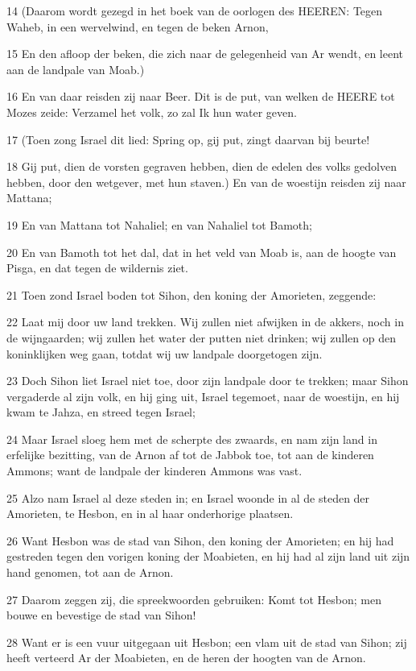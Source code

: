 \par 14 (Daarom wordt gezegd in het boek van de oorlogen des HEEREN: Tegen Waheb, in een wervelwind, en tegen de beken Arnon,
\par 15 En den afloop der beken, die zich naar de gelegenheid van Ar wendt, en leent aan de landpale van Moab.)
\par 16 En van daar reisden zij naar Beer. Dit is de put, van welken de HEERE tot Mozes zeide: Verzamel het volk, zo zal Ik hun water geven.
\par 17 (Toen zong Israel dit lied: Spring op, gij put, zingt daarvan bij beurte!
\par 18 Gij put, dien de vorsten gegraven hebben, dien de edelen des volks gedolven hebben, door den wetgever, met hun staven.) En van de woestijn reisden zij naar Mattana;
\par 19 En van Mattana tot Nahaliel; en van Nahaliel tot Bamoth;
\par 20 En van Bamoth tot het dal, dat in het veld van Moab is, aan de hoogte van Pisga, en dat tegen de wildernis ziet.
\par 21 Toen zond Israel boden tot Sihon, den koning der Amorieten, zeggende:
\par 22 Laat mij door uw land trekken. Wij zullen niet afwijken in de akkers, noch in de wijngaarden; wij zullen het water der putten niet drinken; wij zullen op den koninklijken weg gaan, totdat wij uw landpale doorgetogen zijn.
\par 23 Doch Sihon liet Israel niet toe, door zijn landpale door te trekken; maar Sihon vergaderde al zijn volk, en hij ging uit, Israel tegemoet, naar de woestijn, en hij kwam te Jahza, en streed tegen Israel;
\par 24 Maar Israel sloeg hem met de scherpte des zwaards, en nam zijn land in erfelijke bezitting, van de Arnon af tot de Jabbok toe, tot aan de kinderen Ammons; want de landpale der kinderen Ammons was vast.
\par 25 Alzo nam Israel al deze steden in; en Israel woonde in al de steden der Amorieten, te Hesbon, en in al haar onderhorige plaatsen.
\par 26 Want Hesbon was de stad van Sihon, den koning der Amorieten; en hij had gestreden tegen den vorigen koning der Moabieten, en hij had al zijn land uit zijn hand genomen, tot aan de Arnon.
\par 27 Daarom zeggen zij, die spreekwoorden gebruiken: Komt tot Hesbon; men bouwe en bevestige de stad van Sihon!
\par 28 Want er is een vuur uitgegaan uit Hesbon; een vlam uit de stad van Sihon; zij heeft verteerd Ar der Moabieten, en de heren der hoogten van de Arnon.
